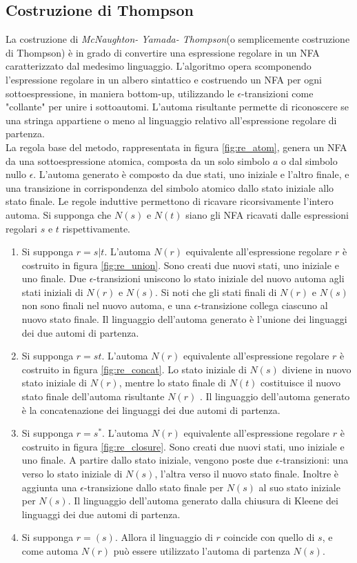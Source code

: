 \subsection{Costruzione di Thompson}
La costruzione di \emph{McNaughton- Yamada- Thompson}(o semplicemente costruzione di Thompson) è in grado di convertire una espressione regolare in un NFA caratterizzato dal medesimo linguaggio. L'algoritmo opera scomponendo l'espressione regolare in un albero sintattico e costruendo un NFA per ogni sottoespressione, in maniera bottom-up, utilizzando le $\epsilon$-transizioni come "collante" per unire i sottoautomi. L'automa risultante permette di riconoscere se una stringa appartiene o meno al linguaggio relativo all'espressione regolare di partenza.\\
La regola base del metodo, rappresentata in figura \ref{fig:re_atom}, genera un NFA da una sottoespressione atomica, composta da un solo simbolo $a$ o dal simbolo nullo $\epsilon$. L'automa generato è composto da due stati, uno iniziale e l'altro finale, e una transizione in corrispondenza del simbolo atomico dallo stato iniziale allo stato finale.
Le regole induttive permettono di ricavare ricorsivamente l'intero automa.
Si supponga che $N(s)$ e $N(t)$ siano gli NFA ricavati dalle espressioni regolari $s$ e $t$ rispettivamente.
\begin{enumerate}
\item Si supponga $r = s|t$. L'automa $N(r)$ equivalente all'espressione regolare $r$ è costruito in figura \ref{fig:re_union}. Sono creati due nuovi stati, uno iniziale e uno finale. Due $\epsilon$-transizioni uniscono lo stato iniziale del nuovo automa agli stati iniziali di $N(r)$ e $N(s)$. Si noti che gli stati finali di $N(r)$ e $N(s)$ non sono finali nel nuovo automa, e una $\epsilon$-transizione collega ciascuno al nuovo stato finale. Il linguaggio dell'automa generato è l'unione dei linguaggi dei due automi di partenza.
\item Si supponga $r = st$. L'automa $N(r)$ equivalente all'espressione regolare $r$ è costruito in figura \ref{fig:re_concat}. Lo stato iniziale di $N(s)$ diviene in nuovo stato iniziale di $N(r)$, mentre lo stato finale di $N(t)$ costituisce il nuovo stato finale dell'automa risultante $N(r)$ . Il linguaggio dell'automa generato è la concatenazione dei linguaggi dei due automi di partenza.
\item Si supponga $r = s^*$. L'automa $N(r)$ equivalente all'espressione regolare $r$ è costruito in figura \ref{fig:re_closure}. Sono creati due nuovi stati, uno iniziale e uno finale. A partire dallo stato iniziale, vengono poste due $\epsilon$-transizioni: una verso lo stato iniziale di $N(s)$, l'altra verso il nuovo stato finale. Inoltre è aggiunta una $\epsilon$-transizione dallo stato finale per $N(s)$ al suo stato iniziale per $N(s)$. Il linguaggio dell'automa generato dalla chiusura di Kleene dei linguaggi dei due automi di partenza.
\item Si supponga $r = (s)$. Allora il linguaggio di $r$ coincide con quello di $s$, e come automa $N(r)$ può essere utilizzato l'automa di partenza $N(s)$.
\end{enumerate} 


